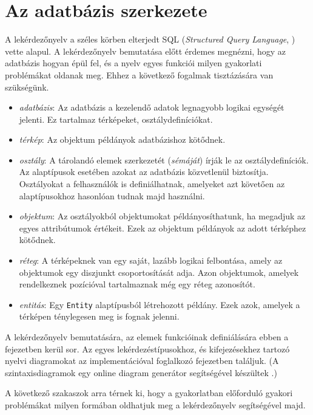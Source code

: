 
\section{Az adatbázis szerkezete}

A lekérdezőnyelv a széles körben elterjedt SQL (\textit{Structured Query Language}, \cite{SQL}) vette alapul. A lekérdezőnyelv bemutatása előtt érdemes megnézni, hogy az adatbázis hogyan épül fel, és a nyelv egyes funkciói milyen gyakorlati problémákat oldanak meg. Ehhez a következő fogalmak tisztázására van szükségünk.
\begin{itemize}
\item \textit{adatbázis}: Az adatbázis a kezelendő adatok legnagyobb logikai egységét jelenti. Ez tartalmaz térképeket, osztálydefiníciókat.
\item \textit{térkép}: Az objektum példányok adatbázishoz kötődnek.
\item \textit{osztály}: A tárolandó elemek szerkezetét (\textit{sémáját}) írják le az osztálydefiníciók. Az alaptípusok esetében azokat az adatbázis közvetlenül biztosítja. Osztályokat a felhasználók is definiálhatnak, amelyeket azt követően az alaptípusokhoz hasonlóan tudnak majd használni.
\item \textit{objektum}: Az osztályokból objektumokat példányosíthatunk, ha megadjuk az e\-gyes attribútumok értékeit. Ezek az objektum példányok az adott térképhez kötődnek.
\item \textit{réteg}: A térképeknek van egy saját, lazább logikai felbontása, amely az objektumok egy diszjunkt csoportosítását adja. Azon objektumok, amelyek rendelkeznek pozícióval tartalmaznak még egy réteg azonosítót.
\item \textit{entitás}: Egy \texttt{Entity} alaptípusból létrehozott példány. Ezek azok, amelyek a térképen ténylegesen meg is fognak jelenni.
\end{itemize}

A lekérdezőnyelv bemutatására, az elemek funkcióinak definiálására ebben a fejezetben kerül sor. Az egyes lekérdezéstípusokhoz, és kifejezésekhez tartozó nyelvi diagramokat az implementációval foglalkozó fejezetben találjuk. (A szintaxisdiagramok egy online diagram generátor segítségével készültek \cite{RDG}.)

A következő szakaszok arra térnek ki, hogy a gyakorlatban előforduló gyakori problémákat milyen formában oldhatjuk meg a lekérdezőnyelv segítségével majd.

